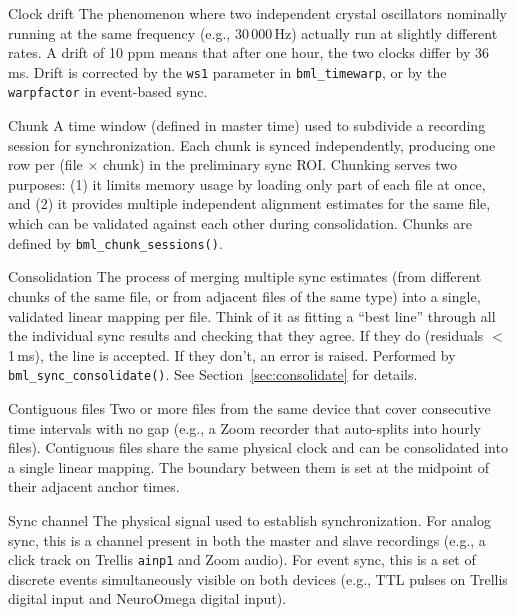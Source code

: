 \documentclass[11pt, a4paper]{article}
\begin{document}
\begin{glossentry}{Clock drift}
The phenomenon where two independent crystal oscillators nominally running at the same frequency (e.g., 30\,000\,Hz) actually run at slightly different rates. A drift of 10 ppm means that after one hour, the two clocks differ by 36\,ms. Drift is corrected by the \texttt{ws1} parameter in \texttt{bml\_timewarp}, or by the \texttt{warpfactor} in event-based sync.
\end{glossentry}

\begin{glossentry}{Chunk}
A time window (defined in master time) used to subdivide a recording session for synchronization. Each chunk is synced independently, producing one row per (file $\times$ chunk) in the preliminary sync ROI. Chunking serves two purposes: (1) it limits memory usage by loading only part of each file at once, and (2) it provides multiple independent alignment estimates for the same file, which can be validated against each other during consolidation. Chunks are defined by \texttt{bml\_chunk\_sessions()}.
\end{glossentry}

\begin{glossentry}{Consolidation}
The process of merging multiple sync estimates (from different chunks of the same file, or from adjacent files of the same type) into a single, validated linear mapping per file. Think of it as fitting a ``best line'' through all the individual sync results and checking that they agree. If they do (residuals $<$ 1\,ms), the line is accepted. If they don't, an error is raised. Performed by \texttt{bml\_sync\_consolidate()}. See Section~\ref{sec:consolidate} for details.
\end{glossentry}

\begin{glossentry}{Contiguous files}
Two or more files from the same device that cover consecutive time intervals with no gap (e.g., a Zoom recorder that auto-splits into hourly files). Contiguous files share the same physical clock and can be consolidated into a single linear mapping. The boundary between them is set at the midpoint of their adjacent anchor times.
\end{glossentry}

\begin{glossentry}{Sync channel}
The physical signal used to establish synchronization. For analog sync, this is a channel present in both the master and slave recordings (e.g., a click track on Trellis \texttt{ainp1} and Zoom audio). For event sync, this is a set of discrete events simultaneously visible on both devices (e.g., TTL pulses on Trellis digital input and NeuroOmega digital input).
\end{glossentry}
\end{document}
